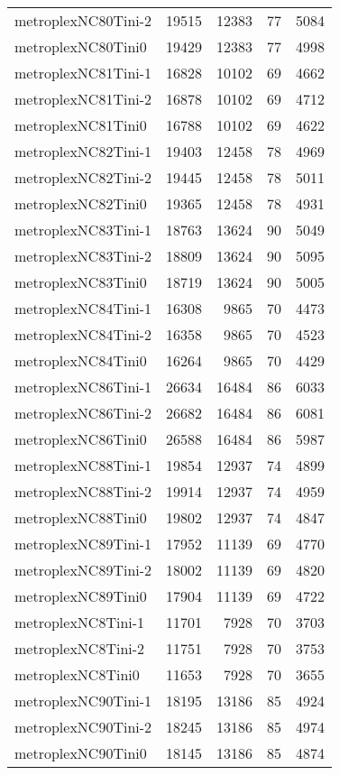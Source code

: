 \begin{longtable}{lrrrr}
metroplexNC80Tini-2 & 19515 & 12383 & 77 & 5084 \\
metroplexNC80Tini0 & 19429 & 12383 & 77 & 4998 \\
metroplexNC81Tini-1 & 16828 & 10102 & 69 & 4662 \\
metroplexNC81Tini-2 & 16878 & 10102 & 69 & 4712 \\
metroplexNC81Tini0 & 16788 & 10102 & 69 & 4622 \\
metroplexNC82Tini-1 & 19403 & 12458 & 78 & 4969 \\
metroplexNC82Tini-2 & 19445 & 12458 & 78 & 5011 \\
metroplexNC82Tini0 & 19365 & 12458 & 78 & 4931 \\
metroplexNC83Tini-1 & 18763 & 13624 & 90 & 5049 \\
metroplexNC83Tini-2 & 18809 & 13624 & 90 & 5095 \\
metroplexNC83Tini0 & 18719 & 13624 & 90 & 5005 \\
metroplexNC84Tini-1 & 16308 & 9865 & 70 & 4473 \\
metroplexNC84Tini-2 & 16358 & 9865 & 70 & 4523 \\
metroplexNC84Tini0 & 16264 & 9865 & 70 & 4429 \\
metroplexNC86Tini-1 & 26634 & 16484 & 86 & 6033 \\
metroplexNC86Tini-2 & 26682 & 16484 & 86 & 6081 \\
metroplexNC86Tini0 & 26588 & 16484 & 86 & 5987 \\
metroplexNC88Tini-1 & 19854 & 12937 & 74 & 4899 \\
metroplexNC88Tini-2 & 19914 & 12937 & 74 & 4959 \\
metroplexNC88Tini0 & 19802 & 12937 & 74 & 4847 \\
metroplexNC89Tini-1 & 17952 & 11139 & 69 & 4770 \\
metroplexNC89Tini-2 & 18002 & 11139 & 69 & 4820 \\
metroplexNC89Tini0 & 17904 & 11139 & 69 & 4722 \\
metroplexNC8Tini-1 & 11701 & 7928 & 70 & 3703 \\
metroplexNC8Tini-2 & 11751 & 7928 & 70 & 3753 \\
metroplexNC8Tini0 & 11653 & 7928 & 70 & 3655 \\
metroplexNC90Tini-1 & 18195 & 13186 & 85 & 4924 \\
metroplexNC90Tini-2 & 18245 & 13186 & 85 & 4974 \\
metroplexNC90Tini0 & 18145 & 13186 & 85 & 4874 \\

\end{longtable}

